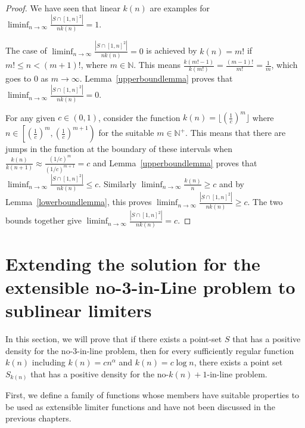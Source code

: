 \documentclass[11pt,a4paper]{article}
\numberwithin{equation}{section}
\newcommand{\nn}{\mathbb{N}}
\begin{document}
\begin{proof}
We have seen that linear $k(n)$ are examples for $\displaystyle\liminf_{n\to\infty} \frac{|S \cap [1,n]^2|}{n k(n)}=1$.

The case of $\displaystyle\liminf_{n\to\infty} \frac{|S \cap [1,n]^2|}{n k(n)}=0$ is achieved by $k(n)=m!$ if $m!\le n<(m+1)! $, where $m\in\nn$. This means $\frac{k(m!-1)}{k(m!)}=\frac{(m-1)!}{m!}=\frac1m$, which goes to $0$ as $m\to\infty$. Lemma~\ref{upperboundlemma} proves that $\displaystyle\liminf_{n\to\infty} \frac{|S \cap [1,n]^2|}{n k(n)}=0$.

For any given $c \in (0,1)$, consider the function $k(n) = \lfloor \left(\frac{1}{c}\right)^m\rfloor $ where $n \in\left[\left(\frac{1}{c}\right)^m, (\frac{1}{c})^{m+1} \right)$ for the suitable $m \in \nn^+$. This means that there are jumps in the function at the boundary of these intervals when $\frac{k(n)}{k(n+1)}\approx\frac{(1/c)^m}{(1/c)^{m+1}}=c$ and Lemma~\ref{upperboundlemma} proves that $\displaystyle\liminf_{n\to\infty} \frac{|S \cap [1,n]^2|}{n k(n)}\le c$. Similarly $\displaystyle\liminf_{n\to\infty} \frac{k(n)}{n}\ge c$ and by Lemma~\ref{lowerboundlemma}, this proves $\displaystyle\liminf_{n\to\infty} \frac{|S \cap [1,n]^2|}{n k(n)}\ge c$. The two bounds together give $\displaystyle\liminf_{n\to\infty} \frac{|S \cap [1,n]^2|}{n k(n)}=c$.
\end{proof}
\section{Extending the solution for the extensible no-3-in-Line problem to sublinear limiters}

In this section, we will prove that if there exists a point-set $S$ that has a positive density for the no-3-in-line problem, then for every sufficiently regular function $k(n)$ including $k(n)=cn^\alpha$ and $k(n)=c\log n$, there exists a point set $S_{k(n)}$ that has a positive density for the no-$k(n)+1$-in-line problem.

First, we define a family of functions whose members have suitable properties to be used as extensible limiter functions and have not been discussed in the previous chapters.
\end{document}
